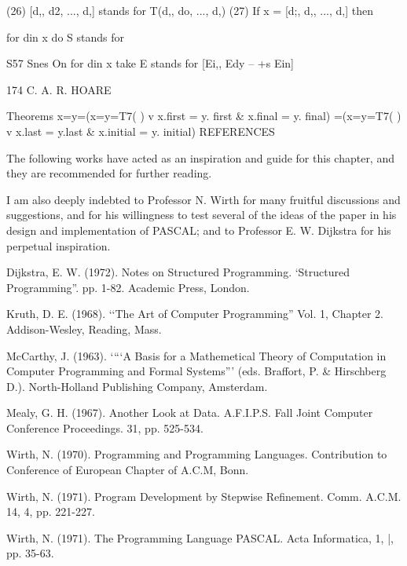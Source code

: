 (26) [d,, d2, ..., d,] stands for T(d,, do, ..., d,) (27) If x = [d;, d,, ..., d,] then

for din x do S stands for

S57 Snes On for din x take E stands for [Ei,, Edy -- +s Ein]

174 C. A. R. HOARE

Theorems x=y=(x=y=T7( ) v x.first = y. first & x.final = y. final) =(x=y=T7( ) v x.last = y.last & x.initial = y. initial) REFERENCES

The following works have acted as an inspiration and guide for this chapter, and they are recommended for further reading.

I am also deeply indebted to Professor N. Wirth for many fruitful discussions and suggestions, and for his willingness to test several of the ideas of the paper in his design and implementation of PASCAL; and to Professor E. W. Dijkstra for his perpetual inspiration.

Dijkstra, E. W. (1972). Notes on Structured Programming. ‘Structured Programming”. pp. 1-82. Academic Press, London.

Kruth, D. E. (1968). ‘‘The Art of Computer Programming” Vol. 1, Chapter 2. Addison-Wesley, Reading, Mass.

McCarthy, J. (1963). ‘“‘A Basis for a Mathemetical Theory of Computation in Computer Programming and Formal Systems”’ (eds. Braffort, P. & Hirschberg D.). North-Holland Publishing Company, Amsterdam.

Mealy, G. H. (1967). Another Look at Data. A.F.I.P.S. Fall Joint Computer Conference Proceedings. 31, pp. 525-534.

Wirth, N. (1970). Programming and Programming Languages. Contribution to Conference of European Chapter of A.C.M, Bonn.

Wirth, N. (1971). Program Development by Stepwise Refinement. Comm. A.C.M. 14, 4, pp. 221-227.

Wirth, N. (1971). The Programming Language PASCAL. Acta Informatica, 1, |, pp. 35-63.
